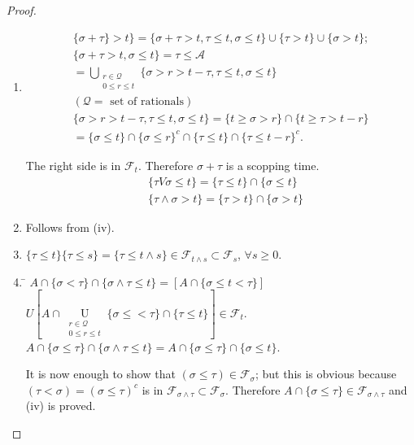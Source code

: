 \begin{proof}
\begin{enumerate}
\renewcommand{\theenumi}{\roman{enumi}}
\renewcommand{\labelenumi}{(\theenumi)}
\item 
\begin{gather*}
\{\sigma+\tau\}>t\}=\{\sigma+\tau>t,\tau\leq t,\sigma\leq t\}\cup 
\{\tau>t\}\cup \{\sigma>t\};\\
\{\sigma+\tau>t,\sigma\leq t\}=\tau\leq
\mathscr{A}\\ 
=\bigcup\limits_{\substack{r\in \mathscr{Q}\\ 0\leq r\leq
    t}}\{\sigma>r>t-\tau,\tau\leq t,\sigma\leq t\}\\
(\mathscr{Q}=\text{~set of rationals})\\
\{\sigma>r>t-\tau,\tau\leq t,\sigma\leq t\}=\{t\geq \sigma>r\}\cap
\{t\geq \tau>t-r\}\\
=\{\sigma\leq t\}\cap \{\sigma\leq r\}^{c}\cap \{\tau\leq
t\}\cap\{\tau\leq t-r\}^{c}. 
\end{gather*}

The right side is in $\mathscr{F}_{t}$. Therefore $\sigma+\tau$ is a
scopping time.
\begin{align*}
& \{\tau V\sigma\leq t\}=\{\tau\leq t\}\cap \{\sigma\leq t\}\\
& \{\tau \wedge \sigma>t\}=\{\tau>t\}\cap \{\sigma>t\}
\end{align*}

\item Follows from (iv).

\item $\{\tau\leq t\}\{\tau\leq s\}=\{\tau\leq t\wedge s\}\in
  \mathscr{F}_{t\wedge s}\subset \mathscr{F}_{s}$, $\forall s\geq 0$.

\item \begin{tabbing}
\= $A\cap \{\sigma<\tau\}\cap \{\sigma\wedge \tau\leq t\}=[A\cap
  \{\sigma\leq t<\tau\}]$\\[5pt]
\> $U[A\cap \mathop{U}\limits_{\substack{r\in \mathscr{Q}\\ 0\leq r\leq
      t}}\{\sigma \leq <\tau\}\cap \{\tau\leq t\}]\in
\mathscr{F}_{t}$.\\[5pt] 
\> $A\cap \{\sigma\leq \tau\}\cap \{\sigma\wedge \tau\leq t\}=A\cap
\{\sigma \leq \tau\}\cap \{\sigma\leq t\}$.
\end{tabbing}\pageoriginale

It is now enough to show that $(\sigma\leq \tau)\in
\mathscr{F}_{\sigma}$; but this is obvious because
$(\tau<\sigma)=(\sigma\leq \tau)^{c}$ is in $\mathscr{F}_{\sigma\wedge
  \tau}\subset \mathscr{F}_{\sigma}$. Therefore $A\cap \{\sigma\leq
\tau\}\in \mathscr{F}_{\sigma \wedge \tau}$ and (iv) is proved.


\end{enumerate}
\end{proof}
